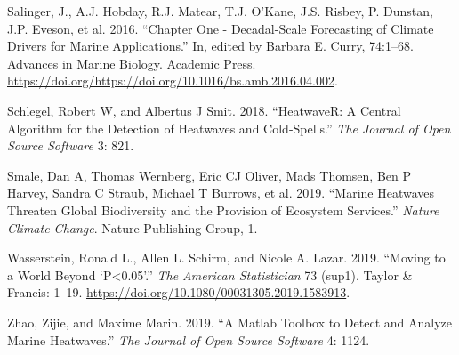 \documentclass[utf8]{frontiersSCNS} %
\begin{document}
\leavevmode\hypertarget{ref-Salinger2016}{}%
Salinger, J., A.J. Hobday, R.J. Matear, T.J. O'Kane, J.S. Risbey, P.
Dunstan, J.P. Eveson, et al. 2016. ``Chapter One - Decadal-Scale
Forecasting of Climate Drivers for Marine Applications.'' In, edited by
Barbara E. Curry, 74:1--68. Advances in Marine Biology. Academic Press.
\url{https://doi.org/https://doi.org/10.1016/bs.amb.2016.04.002}.

\leavevmode\hypertarget{ref-Schlegel2018}{}%
Schlegel, Robert W, and Albertus J Smit. 2018. ``HeatwaveR: A Central
Algorithm for the Detection of Heatwaves and Cold-Spells.'' \emph{The
Journal of Open Source Software} 3: 821.

\leavevmode\hypertarget{ref-Smale2019}{}%
Smale, Dan A, Thomas Wernberg, Eric CJ Oliver, Mads Thomsen, Ben P
Harvey, Sandra C Straub, Michael T Burrows, et al. 2019. ``Marine
Heatwaves Threaten Global Biodiversity and the Provision of Ecosystem
Services.'' \emph{Nature Climate Change}. Nature Publishing Group, 1.

\leavevmode\hypertarget{ref-Wasserstein2019}{}%
Wasserstein, Ronald L., Allen L. Schirm, and Nicole A. Lazar. 2019.
``Moving to a World Beyond `P\textless{}0.05'.'' \emph{The American
Statistician} 73 (sup1). Taylor \& Francis: 1--19.
\url{https://doi.org/10.1080/00031305.2019.1583913}.

\leavevmode\hypertarget{ref-Zhao2019}{}%
Zhao, Zijie, and Maxime Marin. 2019. ``A Matlab Toolbox to Detect and
Analyze Marine Heatwaves.'' \emph{The Journal of Open Source Software}
4: 1124.
\end{document}

